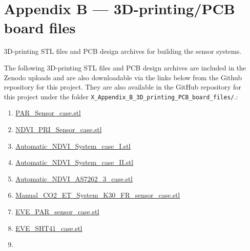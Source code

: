 \documentclass[
  11pt,
  letterpaper,
]{book}
\begin{document}
\section{Appendix B --- 3D-printing/PCB board
files}\label{sec-appendix_B}

3D-printing STL files and PCB design archives for building the sensor
systems.

The following 3D-printing STL files and PCB design archives are included
in the Zenodo uploads and are also downloadable via the links below from
the Github repository for this project. They are also available in the
GitHub repository for this project under the folder
\texttt{X\_Appendix\_B\_3D\_printing\_PCB\_board\_files/}.:

\begin{enumerate}
\def\labelenumi{\arabic{enumi}.}
\item
  \href{https://github.com/zalf-lli/LCSfFE-handbook/blob/main/X_Appendix_B_3D_printing_PCB_board_files/PAR_Sensor_case.stl}{PAR\_Sensor\_case.stl}
\item
  \href{https://github.com/zalf-lli/LCSfFE-handbook/blob/main/X_Appendix_B_3D_printing_PCB_board_files/NDVI_PRI_Sensor_case.stl}{NDVI\_PRI\_Sensor\_case.stl}
\item
  \href{https://github.com/zalf-lli/LCSfFE-handbook/blob/main/X_Appendix_B_3D_printing_PCB_board_files/Automatic_NDVI_System_case_I.stl}{Automatic\_NDVI\_System\_case\_I.stl}
\item
  \href{https://github.com/zalf-lli/LCSfFE-handbook/blob/main/X_Appendix_B_3D_printing_PCB_board_files/Automatic_NDVI_System_case_II.stl}{Automatic\_NDVI\_System\_case\_II.stl}
\item
  \href{https://github.com/zalf-lli/LCSfFE-handbook/blob/main/X_Appendix_B_3D_printing_PCB_board_files/Automatic_NDVI_AS7262_3_case.stl}{Automatic\_NDVI\_AS7262\_3\_case.stl}
\item
  \href{https://github.com/zalf-lli/LCSfFE-handbook/blob/main/X_Appendix_B_3D_printing_PCB_board_files/Manual_CO2_ET_System_K30_FR_sensor_case.stl}{Manual\_CO2\_ET\_System\_K30\_FR\_sensor\_case.stl}
\item
  \href{https://github.com/zalf-lli/LCSfFE-handbook/blob/main/X_Appendix_B_3D_printing_PCB_board_files/EVE_PAR_sensor_case.stl}{EVE\_PAR\_sensor\_case.stl}
\item
  \href{https://github.com/zalf-lli/LCSfFE-handbook/blob/main/X_Appendix_B_3D_printing_PCB_board_files/EVE_SHT41_case.stl}{EVE\_SHT41\_case.stl}
\item

\end{enumerate}
\end{document}
